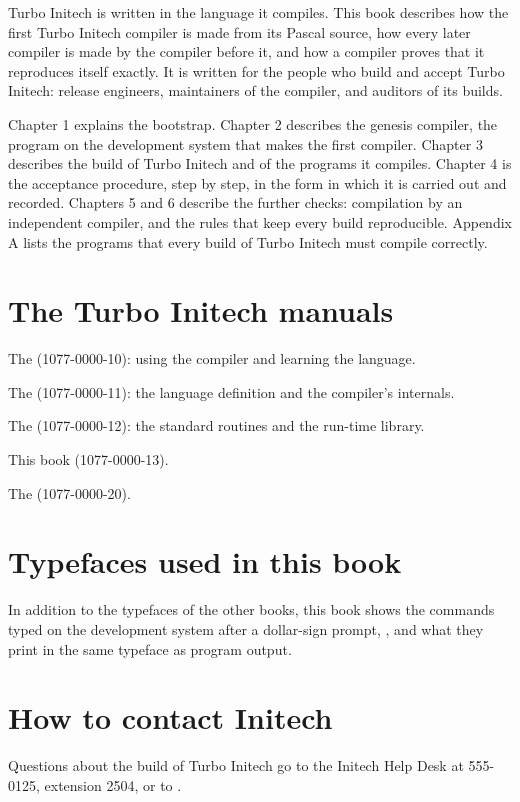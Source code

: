 \IntroductionChapter

Turbo Initech\reg{} is written in the language it compiles.  This book
describes how the first Turbo Initech compiler is made from its Pascal
source, how every later compiler is made by the compiler before it, and
how a compiler proves that it reproduces itself exactly.  It is written for
the people who build and accept Turbo Initech: release engineers,
maintainers of the compiler, and auditors of its builds.

Chapter 1 explains the bootstrap.  Chapter 2 describes the genesis
compiler, the program on the development system that makes the first
compiler.  Chapter 3 describes the build of Turbo Initech and of the
programs it compiles.  Chapter 4 is the acceptance procedure, step by step,
in the form in which it is carried out and recorded.  Chapters 5 and 6
describe the further checks: compilation by an independent compiler, and
the rules that keep every build reproducible.  Appendix A lists the
programs that every build of Turbo Initech must compile correctly.

\section{The Turbo Initech manuals}
The 
(1077-0000-10): using the compiler and learning the language.

The  (1077-0000-11): the language definition and the compiler's
internals.

The 
(1077-0000-12): the standard routines and the run-time library.

This book (1077-0000-13).

The 
(1077-0000-20).

\section{Typefaces used in this book}
In addition to the typefaces of the other books, this book shows the
commands typed on the development system after a dollar-sign prompt,
, and what they print in the same
typeface as program output.

\section{How to contact Initech}
Questions about the build of Turbo Initech go to the Initech Help Desk at
555-0125, extension 2504, or to \InitechAddressLine.
